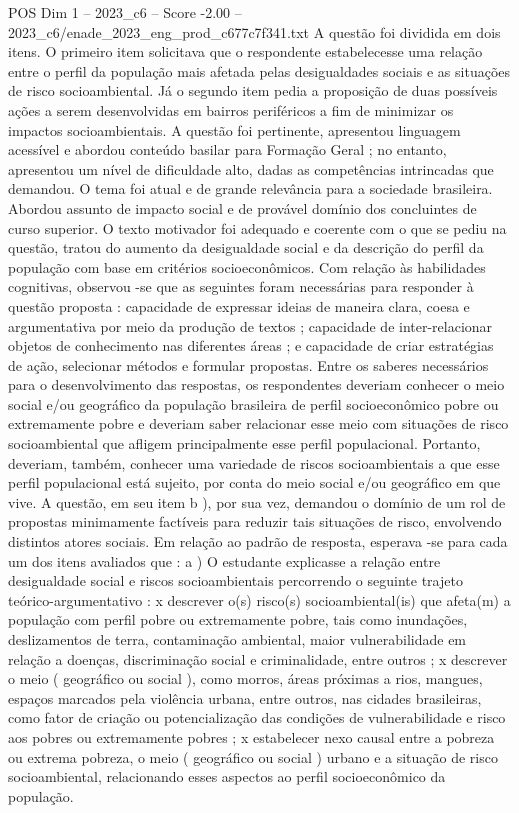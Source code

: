 \begin{textsample}{POS Dim 1 – 2023\_c6 – Score -2.00 – 2023\_c6/enade\_2023\_eng\_prod\_c677c7f341.txt}
A questão foi dividida em dois itens.
O primeiro item solicitava que o respondente estabelecesse uma relação entre o perfil da população mais afetada pelas desigualdades sociais e as situações de risco socioambiental.
Já o segundo item pedia a proposição de duas possíveis ações a serem desenvolvidas em bairros periféricos a fim de minimizar os impactos socioambientais.
A questão foi pertinente, apresentou linguagem acessível e abordou conteúdo basilar para Formação Geral ; no entanto, apresentou um nível de dificuldade alto, dadas as competências intrincadas que demandou.
O tema foi atual e de grande relevância para a sociedade brasileira.
Abordou assunto de impacto social e de provável domínio dos concluintes de curso superior.
O texto motivador foi adequado e coerente com o que se pediu na questão, tratou do aumento da desigualdade social e da descrição do perfil da população com base em critérios socioeconômicos.
Com relação às habilidades cognitivas, observou -se que as seguintes foram necessárias para responder à questão proposta : capacidade de expressar ideias de maneira clara, coesa e argumentativa por meio da produção de textos ; capacidade de inter-relacionar objetos de conhecimento nas diferentes áreas ; e capacidade de criar estratégias de ação, selecionar métodos e formular propostas.
Entre os saberes necessários para o desenvolvimento das respostas, os respondentes deveriam conhecer o meio social e/ou geográfico da população brasileira de perfil socioeconômico pobre ou extremamente pobre e deveriam saber relacionar esse meio com situações de risco socioambiental que afligem principalmente esse perfil populacional.
Portanto, deveriam, também, conhecer uma variedade de riscos socioambientais a que esse perfil populacional está sujeito, por conta do meio social e/ou geográfico em que vive.
A questão, em seu item b ), por sua vez, demandou o domínio de um rol de propostas minimamente factíveis para reduzir tais situações de risco, envolvendo distintos atores sociais.
Em relação ao padrão de resposta, esperava -se para cada um dos itens avaliados que : a ) O estudante explicasse a relação entre desigualdade social e riscos socioambientais percorrendo o seguinte trajeto teórico-argumentativo : x descrever o(s) risco(s) socioambiental(is) que afeta(m) a população com perfil pobre ou extremamente pobre, tais como inundações, deslizamentos de terra, contaminação ambiental, maior vulnerabilidade em relação a doenças, discriminação social e criminalidade, entre outros ; x descrever o meio ( geográfico ou social ), como morros, áreas próximas a rios, mangues, espaços marcados pela violência urbana, entre outros, nas cidades brasileiras, como fator de criação ou potencialização das condições de vulnerabilidade e risco aos pobres ou extremamente pobres ; x estabelecer nexo causal entre a pobreza ou extrema pobreza, o meio ( geográfico ou social ) urbano e a situação de risco socioambiental, relacionando esses aspectos ao perfil socioeconômico da população.

\end{textsample}
